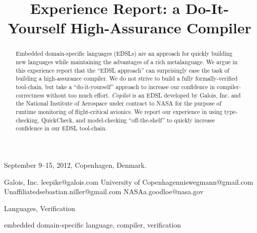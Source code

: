 \documentclass[9pt]{sigplanconf}
\begin{document}
 {September 9--15, 2012, Copenhagen, Denmark.}


\title{Experience Report: a Do-It-Yourself High-Assurance Compiler}

           {Galois, Inc.}
           {leepike@galois.com}
           {University of Copenhagen}{niswegmann@gmail.com}
           {Unaffiliated}{sebastian.niller@gmail.com}
           {NASA}{a.goodloe@nasa.gov}
\maketitle

\begin{abstract}
Embedded domain-specific languages (EDSLs) are an approach for quickly building
new languages while maintaining the advantages of a rich metalanguage.  We argue
in this experience report that the ``EDSL approach'' can surprisingly ease the
task of building a high-assurance compiler.  We do not strive to build a fully
formally-verified tool-chain, but take a ``do-it-yourself'' approach to increase
our confidence in compiler-correctness without too much effort.  \emph{Copilot}
is an EDSL developed by Galois, Inc. and the National Institute of Aerospace
under contract to NASA for the purpose of runtime monitoring of flight-critical
avionics.  We report our experience in using type-checking, QuickCheck, and
model-checking ``off-the-shelf'' to quickly increase confidence in our EDSL
tool-chain.
\end{abstract}


\terms
Languages, Verification

\keywords
embedded domain-specific language, compiler, verification



\end{document}
